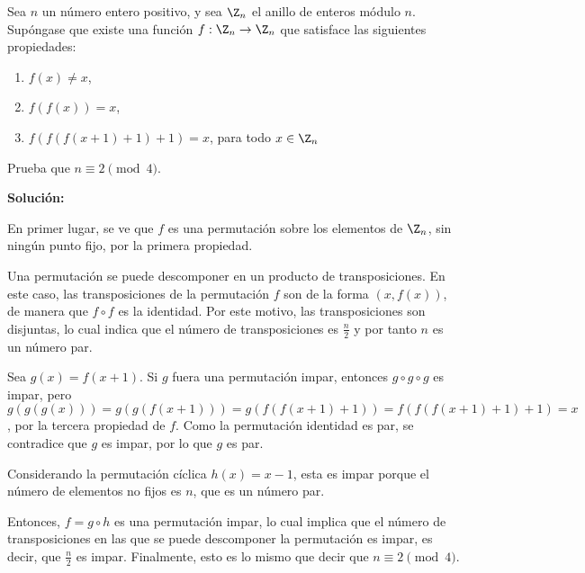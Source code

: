 \documentclass[../../main.tex]{subfiles}
\begin{document}
  \begin{shaded}
    Sea $n$ un número entero positivo, y sea $\Z_n$ el anillo de enteros módulo $n$. Supóngase que existe una función $f: \Z_n \to \Z_n$ que satisface las siguientes propiedades:

    \begin{enumerate}
      \item $f(x) \ne x$,
      \item $f(f(x)) = x$,
      \item $f(f(f(x + 1) + 1) + 1) = x$, para todo $x \in \Z_n$
    \end{enumerate}

    Prueba que $n \equiv 2 \pmod{4}$.
  \end{shaded}

  \textbf{Solución:}

  En primer lugar, se ve que $f$ es una permutación sobre los elementos de $\Z_n$, sin ningún punto fijo, por la primera propiedad.

  Una permutación se puede descomponer en un producto de transposiciones. En este caso, las transposiciones de la permutación $f$ son de la forma $\left(x, f(x)\right)$, de manera que $f \circ f$ es la identidad. Por este motivo, las transposiciones son disjuntas, lo cual indica que el número de transposiciones es $\displaystyle\frac{n}{2}$ y por tanto $n$ es un número par.

  Sea $g(x) = f(x + 1)$. Si $g$ fuera una permutación impar, entonces $g \circ g \circ g$ es impar, pero $g(g(g(x))) = g(g(f(x + 1))) = g(f(f(x + 1) + 1)) = f(f(f(x + 1) + 1) + 1) = x$, por la tercera propiedad de $f$. Como la permutación identidad es par, se contradice que $g$ es impar, por lo que $g$ es par.

  Considerando la permutación cíclica $h(x) = x - 1$, esta es impar porque el número de elementos no fijos es $n$, que es un número par.

  Entonces, $f = g \circ h$ es una permutación impar, lo cual implica que el número de transposiciones en las que se puede descomponer la permutación es impar, es decir, que $\displaystyle\frac{n}{2}$ es impar. Finalmente, esto es lo mismo que decir que $n \equiv 2 \pmod{4}$.
\end{document}
